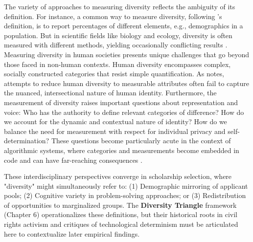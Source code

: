 The variety of approaches to measuring diversity reflects the ambiguity of its definition. For instance, a common way to measure diversity, following \textcite{page_diversity_2010}'s definition, is to report percentages of different elements, e.g., demographics in a population. But in scientific fields like biology and ecology, diversity is often measured with different methods, yielding occasionally conflicting results \cite{xu2020diversity}. Measuring diversity in human societies presents unique challenges that go beyond those faced in non-human contexts. Human diversity encompasses complex, socially constructed categories that resist simple quantification. As \textcite{scheuerman2019computers} notes, attempts to reduce human diversity to measurable attributes often fail to capture the nuanced, intersectional nature of human identity. Furthermore, the measurement of diversity raises important questions about representation and voice: Who has the authority to define relevant categories of difference? How do we account for the dynamic and contextual nature of identity? How do we balance the need for measurement with respect for individual privacy and self-determination? These questions become particularly acute in the context of algorithmic systems, where categories and measurements become embedded in code and can have far-reaching consequences \cite{bowker1999sorting}.

These interdisciplinary perspectives converge in scholarship selection, where "diversity" might simultaneously refer to: (1) Demographic mirroring of applicant pools; (2) Cognitive variety in problem-solving approaches; or (3) Redistribution of opportunities to marginalized groups. The \textbf{Diversity Triangle} framework (Chapter 6) operationalizes these definitions, but their historical roots in civil rights activism and critiques of technological determinism \cite{winner1980artefacts} must be articulated here to contextualize later empirical findings.

